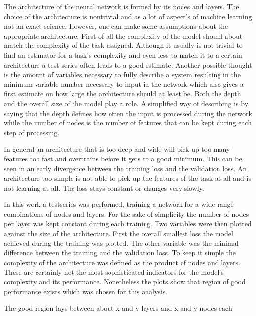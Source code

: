 The architecture of the neural network is formed by its nodes and layers. The choice of the architecture is nontrivial and as a lot of aspect's of machine learning not an exact science.
However, one can make some assumptions about the appropriate architecture.
First of all the complexity of the model should about match the complexity of the task assigned. Although it usually is not trivial to find an estimator for a task's complexity and even less to match it to a certain architecture a test series often leads to a good estimate. Another possible thought is the amount of variables necessary to fully describe a system resulting in the minimum variable number necessary to input in the network which also gives a first estimate on how large the architecture should at least be.
Both the depth and the overall size of the model play a role. A simplified way of describing is by saying that the depth defines how often the input is processed during the network while the number of nodes is the number of features that can be kept during each step of processing.

In general an architecture that is too deep and wide will pick up too many features too fast and overtrains before it gets to a good minimum. This can be seen in an early divergence between the training loss and the validation loss. An architecture too simple is not able to pick up the features of the task at all and is not learning at all. The loss stays constant or changes very slowly.

In this work a testseries was performed, training a network for a wide range combinations of nodes and layers. For the sake of simplicity the number of nodes per layer was kept constant during each training. Two variables were then plotted against the size of the architecture. First the overall smallest loss the model achieved during the training was plotted. The other variable was the minimal difference between the training and the validation loss. To keep it simple the complexity of the architecture was defined as the product of nodes and layers. These are certainly not the most sophisticated indicators for the model's complexity and its performance. Nonetheless the plots show that region of good performance exists which was chosen for this analysis.

The good region lays between about x and y layers and x and y nodes each



